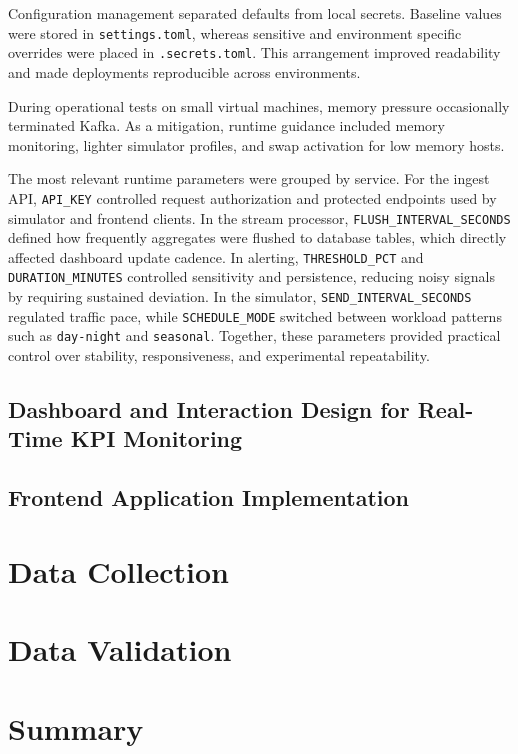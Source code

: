 Configuration management separated defaults from local secrets. Baseline values were stored in \texttt{settings.toml}, whereas sensitive and environment specific overrides were placed in \texttt{.secrets.toml}. This arrangement improved readability and made deployments reproducible across environments.

During operational tests on small virtual machines, memory pressure occasionally terminated Kafka. As a mitigation, runtime guidance included memory monitoring, lighter simulator profiles, and swap activation for low memory hosts.

The most relevant runtime parameters were grouped by service. For the ingest API, \texttt{API\_KEY} controlled request authorization and protected endpoints used by simulator and frontend clients. In the stream processor, \texttt{FLUSH\_INTERVAL\_\allowbreak SECONDS} defined how frequently aggregates were flushed to database tables, which directly affected dashboard update cadence. In alerting, \texttt{THRESHOLD\_PCT} and \texttt{DURATION\_\allowbreak MINUTES} controlled sensitivity and persistence, reducing noisy signals by requiring sustained deviation. In the simulator, \texttt{SEND\_INTERVAL\_\allowbreak SECONDS} regulated traffic pace, while \texttt{SCHEDULE\_MODE} switched between workload patterns such as \texttt{day-night} and \texttt{seasonal}. Together, these parameters provided practical control over stability, responsiveness, and experimental repeatability.



\subsection{Dashboard and Interaction Design for Real-Time KPI Monitoring}

\subsection{Frontend Application Implementation}

\section{Data Collection}

\section{Data Validation}

\section{Summary}

